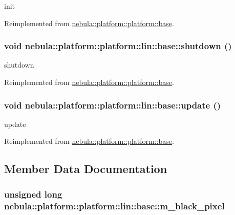 init 

Reimplemented from \hyperlink{classnebula_1_1platform_1_1platform_1_1base_a1098d6ac08afd649c5ce01fbaafd3374}{nebula::platform::platform::base}.\hypertarget{classnebula_1_1platform_1_1platform_1_1lin_1_1base_a524f2d600ae0297bab511783657b33b0}{
\subsubsection[{shutdown}]{\setlength{\rightskip}{0pt plus 5cm}void nebula::platform::platform::lin::base::shutdown ()}}
\label{classnebula_1_1platform_1_1platform_1_1lin_1_1base_a524f2d600ae0297bab511783657b33b0}


shutdown 

Reimplemented from \hyperlink{classnebula_1_1platform_1_1platform_1_1base_ae2dafd0a663fdb8b95211c975c35c79a}{nebula::platform::platform::base}.\hypertarget{classnebula_1_1platform_1_1platform_1_1lin_1_1base_a2c85fc5372d292e5c79df69d07aefcd1}{
\subsubsection[{update}]{\setlength{\rightskip}{0pt plus 5cm}void nebula::platform::platform::lin::base::update ()}}
\label{classnebula_1_1platform_1_1platform_1_1lin_1_1base_a2c85fc5372d292e5c79df69d07aefcd1}


update 

Reimplemented from \hyperlink{classnebula_1_1platform_1_1platform_1_1base_a9036fffff86ce314d44ab292291088c9}{nebula::platform::platform::base}.

\subsection{Member Data Documentation}
\hypertarget{classnebula_1_1platform_1_1platform_1_1lin_1_1base_a97b55fe425a0b4232427e107da26f0cd}{
\subsubsection[{m\_\-black\_\-pixel}]{\setlength{\rightskip}{0pt plus 5cm}unsigned long {\bf nebula::platform::platform::lin::base::m\_\-black\_\-pixel}}}
\label{classnebula_1_1platform_1_1platform_1_1lin_1_1base_a97b55fe425a0b4232427e107da26f0cd}


